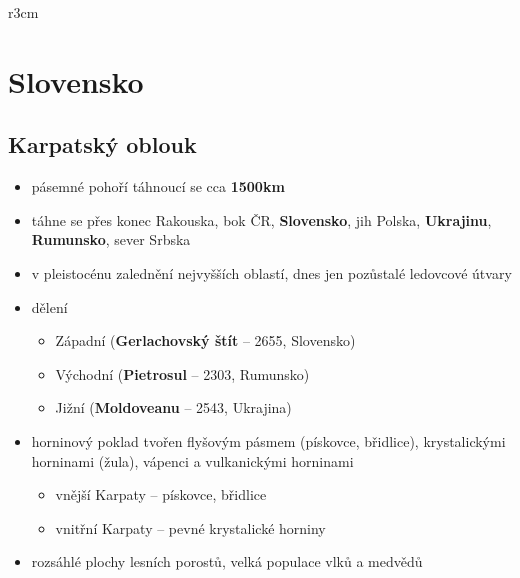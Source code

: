 \documentclass[10pt,a4paper]{article}
\begin{document}
\newpage
\mbox{}
\vspace{-1.5cm}
\begin{wrapfigure}{r}{3cm}
\vspace{-200pt}
\end{wrapfigure}	
\section{Slovensko} 
\subsection{Karpatský oblouk}
\begin{itemize}
\item pásemné pohoří táhnoucí se cca \textbf{1500km}
\item táhne se přes konec Rakouska, bok ČR, \textbf{Slovensko}, jih Polska, \textbf{Ukrajinu}, \textbf{Rumunsko}, sever Srbska
\item v pleistocénu zalednění nejvyšších oblastí, dnes jen pozůstalé ledovcové útvary
\item dělení
\begin{itemize}
\item Západní (\textbf{Gerlachovský štít} -- 2655, Slovensko)
\item Východní (\textbf{Pietrosul} -- 2303, Rumunsko)
\item Jižní (\textbf{Moldoveanu} -- 2543, Ukrajina)
\end{itemize}
\item horninový poklad tvořen flyšovým pásmem (pískovce, břidlice), krystalickými horninami (žula), vápenci a vulkanickými horninami
\begin{itemize}
\item vnější Karpaty -- pískovce, břidlice
\item vnitřní Karpaty -- pevné krystalické horniny
\end{itemize}
\item rozsáhlé plochy lesních porostů, velká populace vlků a medvědů
\end{itemize}
\end{document}
